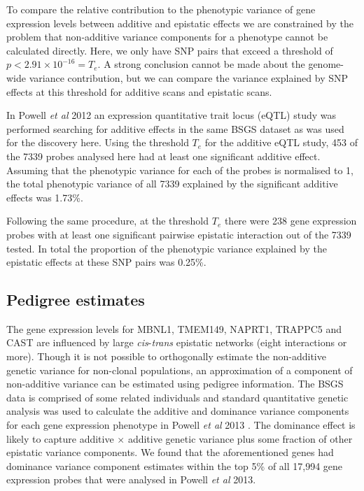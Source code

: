 \documentclass{article}
\begin{document}
To compare the relative contribution to the phenotypic variance of gene expression levels between additive and epistatic effects we are constrained by the problem that non-additive variance components for a phenotype cannot be calculated directly. Here, we only have SNP pairs that exceed a threshold of $p < 2.91 \times 10^{-16} = T_{e}$. A strong conclusion cannot be made about the genome-wide variance contribution, but we can compare the variance explained by SNP effects at this threshold for additive scans and epistatic scans. 

In Powell \emph{et al} 2012 \cite{Powell2012} an expression quantitative trait locus (eQTL) study was performed searching for additive effects in the same BSGS dataset as was used for the discovery here. Using the threshold $T_{e}$ for the additive eQTL study, 453 of the 7339 probes analysed here had at least one significant additive effect. Assuming that the phenotypic variance for each of the probes is normalised to 1, the total phenotypic variance of all 7339 explained by the significant additive effects was 1.73\%.

Following the same procedure, at the threshold $T_{e}$ there were 238 gene expression probes with at least one significant pairwise epistatic interaction out of the 7339 tested. In total the proportion of the phenotypic variance explained by the epistatic effects at these SNP pairs was 0.25\%.


\subsection{Pedigree estimates}

The gene expression levels for MBNL1, TMEM149, NAPRT1, TRAPPC5 and CAST are influenced by large \emph{cis}-\emph{trans} epistatic networks (eight interactions or more). Though it is not possible to orthogonally estimate the non-additive genetic variance for non-clonal populations, an approximation of a component of non-additive variance can be estimated using pedigree information. The BSGS data is comprised of some related individuals and standard quantitative genetic analysis was used to calculate the additive and dominance variance components for each gene expression phenotype in Powell \emph{et al} 2013 \cite{Powell2013}. The dominance effect is likely to capture additive $\times$ additive genetic variance plus some fraction of other epistatic variance components. We found that the aforementioned genes had dominance variance component estimates within the top 5\% of all 17,994 gene expression probes that were analysed in Powell \emph{et al} 2013.
\end{document}
